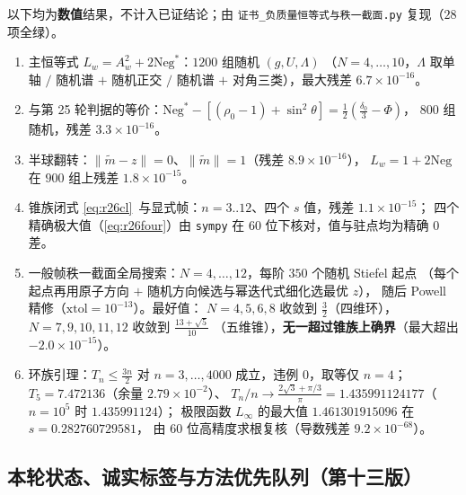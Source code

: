 \documentclass[UTF8,11pt]{ctexart}
\theoremstyle{definition}
\newcommand{\Lam}{\Lambda}
\begin{document}
以下均为\textbf{数值}结果，不计入已证结论；由
\texttt{证书\_负质量恒等式与秩一截面.py} 复现（$28$ 项全绿）。
\begin{enumerate}\itemsep2pt
\item 主恒等式 $L_w=A_w^2+2\mathrm{Neg}^*$：$1200$ 组随机 $(g,U,\Lam)$
（$N=4,\dots,10$，$\Lam$ 取单轴 $/$ 随机谱 $+$ 随机正交 $/$ 随机谱 $+$ 对角三类），最大残差 $6.7\times10^{-16}$。
\item 与第 25 轮判据的等价：$\mathrm{Neg}^*-[(\rho_0-1)+\sin^2\theta]=\frac12(\frac{\delta_0}3-\Phi)$，
$800$ 组随机，残差 $3.3\times10^{-16}$。
\item 半球翻转：$\|\widetilde m-z\|=0$、$\|\widetilde m\|=1$（残差 $8.9\times10^{-16}$），
$L_w=1+2\mathrm{Neg}$ 在 $900$ 组上残差 $1.8\times10^{-15}$。
\item 锥族闭式 \eqref{eq:r26cl}~与显式帧：$n=3..12$、四个 $s$ 值，残差 $1.1\times10^{-15}$；
四个精确极大值（\eqref{eq:r26four}）由 \texttt{sympy} 在 $60$ 位下核对，值与驻点均为精确 $0$ 差。
\item 一般帧秩一截面全局搜索：$N=4,\dots,12$，每阶 $350$ 个随机 Stiefel 起点
（每个起点再用原子方向 $+$ 随机方向候选与幂迭代式细化选最优 $z$），
随后 Powell 精修（$\mathrm{xtol}=10^{-13}$）。最好值：
$N=4,5,6,8$ 收敛到 $\frac32$（四维环），$N=7,9,10,11,12$ 收敛到 $\frac{13+\sqrt5}{10}$
（五维锥），\textbf{无一超过锥族上确界}（最大超出 $-2.0\times10^{-15}$）。
\item 环族引理：$T_n\le\frac{3n}2$ 对 $n=3,\dots,4000$ 成立，违例 $0$，取等仅 $n=4$；
$T_5=7.472136$（余量 $2.79\times10^{-2}$）、
 $T_n/n\to\frac{2\sqrt3+\pi/3}{\pi}=1.435991124177$（$n=10^5$ 时 $1.435991124$）；
 极限函数 $L_\infty$ 的最大值 $1.461301915096$ 在 $s=0.282760729581$，
 由 $60$ 位高精度求根复核（导数残差 $9.2\times10^{-68}$）。
\end{enumerate}

\subsection{本轮状态、诚实标签与方法优先队列（第十三版）}\label{sec:r26:status}
\end{document}
